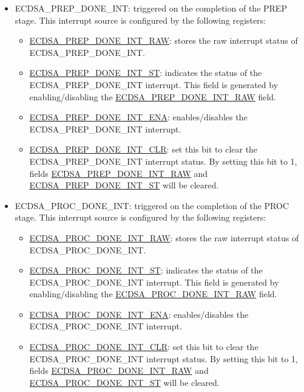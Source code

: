 \documentclass[main\_\_EN.tex]{subfiles}
\begin{document}
\begin{itemize}
	\item \label{int:ECDSAPREPDONEINT}ECDSA\_PREP\_DONE\_INT: triggered on the completion of the PREP stage. This interrupt source is configured by the following registers:
	      \begin{itemize}
		      \item \hyperref[fielddesc:ECDSAPREPDONEINTRAW]{ECDSA\_PREP\_DONE\_INT\_RAW}: stores the raw interrupt status of ECDSA\_PREP\_DONE\_INT.
		      \item \hyperref[fielddesc:ECDSAPREPDONEINTST]{ECDSA\_PREP\_DONE\_INT\_ST}: indicates the status of the ECDSA\_PREP\_DONE\_INT interrupt. This field is generated by enabling/disabling the \hyperref[fielddesc:ECDSAPREPDONEINTRAW]{ECDSA\_PREP\_DONE\_INT\_RAW} field.
		      \item \hyperref[fielddesc:ECDSAPREPDONEINTENA]{ECDSA\_PREP\_DONE\_INT\_ENA}: enables/disables the ECDSA\_PREP\_DONE\_INT interrupt.
		      \item \hyperref[fielddesc:ECDSAPREPDONEINTCLR]{ECDSA\_PREP\_DONE\_INT\_CLR}: set this bit to clear the ECDSA\_PREP\_DONE\_INT interrupt status. By setting this bit to 1, fields \hyperref[fielddesc:ECDSAPREPDONEINTRAW]{ECDSA\_PREP\_DONE\_INT\_RAW} and  \hyperref[fielddesc:ECDSAPREPDONEINTST]{ECDSA\_PREP\_DONE\_INT\_ST} will be cleared.
	      \end{itemize}
	\item \label{int:ECDSAPROCDONEINT}ECDSA\_PROC\_DONE\_INT: triggered on the completion of the PROC stage. This interrupt source is configured by the following registers:
	      \begin{itemize}
		      \item \hyperref[fielddesc:ECDSAPROCDONEINTRAW]{ECDSA\_PROC\_DONE\_INT\_RAW}: stores the raw interrupt status of ECDSA\_PROC\_DONE\_INT.
		      \item \hyperref[fielddesc:ECDSAPROCDONEINTST]{ECDSA\_PROC\_DONE\_INT\_ST}: indicates the status of the ECDSA\_PROC\_DONE\_INT interrupt. This field is generated by enabling/disabling the \hyperref[fielddesc:ECDSAPROCDONEINTRAW]{ECDSA\_PROC\_DONE\_INT\_RAW} field.
		      \item \hyperref[fielddesc:ECDSAPROCDONEINTENA]{ECDSA\_PROC\_DONE\_INT\_ENA}: enables/disables the ECDSA\_PROC\_DONE\_INT interrupt.
		      \item \hyperref[fielddesc:ECDSAPROCDONEINTCLR]{ECDSA\_PROC\_DONE\_INT\_CLR}: set this bit to clear the ECDSA\_PROC\_DONE\_INT interrupt status. By setting this bit to 1, fields \hyperref[fielddesc:ECDSAPROCDONEINTRAW]{ECDSA\_PROC\_DONE\_INT\_RAW} and  \hyperref[fielddesc:ECDSAPROCDONEINTST]{ECDSA\_PROC\_DONE\_INT\_ST} will be cleared.

\end{itemize}
\end{itemize}
\end{document}
